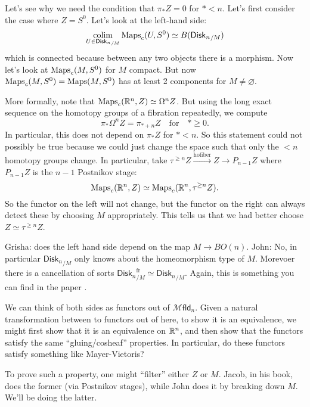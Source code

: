 \documentclass{amsart}
\DeclareMathOperator{\hofiber}{hofiber}
\newcommand{\disk}{\mathsf{Disk}_n}
\begin{document}
\begin{remark}
    Let's see why we need the condition that $\pi_*Z=0$ for $*<n$. Let's first consider the case
    where $Z=S^0$. Let's look at the left-hand side:
    \begin{align*}
        \colim_{U\in{\disk}_{/M}} \Maps_c(U,S^0) \simeq B({\disk}_{/M})
    \end{align*}
    which is connected because between any two objects there is a morphism.
    Now let's look at $\operatorname{Maps}_c(M, S^0)$ for $M$ compact. But now $\operatorname{Maps}_c(M,S^0)=\operatorname{Maps}(M,S^0)$
    has at least 2 components for $M\neq \varnothing$.

    More formally, note that $\operatorname{Maps}_c(\mathbb{R}^n,Z)\simeq \Omega^nZ$. But using the long exact
    sequence on the homotopy groups of a fibration repeatedly, we compute
    \begin{equation*}
        \pi_*\Omega^nZ = \pi_{*+n}Z \quad\text{for}\quad*\geqslant 0.
    \end{equation*}
    In particular, this does not depend on $\pi_*Z$ for $*<n$. So this statement
    could not possibly be true because we could just change the space such
    that only the $<n$ homotopy groups change. In particular, take
    $\tau^{\geq n}Z \xrightarrow{\hofiber} Z \to P_{n-1}Z$ where $P_{n-1}Z$
    is the $n-1$ Postnikov stage:
    \begin{equation*}
        \operatorname{Maps}_c(\mathbb{R}^n,Z) \simeq \operatorname{Maps}_c(\mathbb{R}^n,\tau^{\geq n}Z).
    \end{equation*}
    So the functor on the left will not change, but the functor on the right
    can always detect these by choosing $M$ appropriately. This tells us that
    we had better choose $Z\simeq \tau^{\geq n}Z$.
\end{remark}

Grisha: does the left hand side depend on the map $M\to BO(n)$. John: No,
in particular ${\disk}_{/M}$ only knows about the homeomorphism type of $M$.
Morevoer there is a cancellation of sorts ${\disk}_{/M}^\text{fr}\simeq {\disk}_{/M}$.
Again, this is something you can find in the paper \cite{AF}.

We can think of both sides as functors out of $\mathcal{M}\mathsf{fld}_n$. Given a natural
transformation between to functors out of here, to show it is an equivalence, we might
first show that it is an equivalence on $\mathbb{R}^n$, and then show that the functors satisfy
the same ``gluing/cosheaf'' properties. In particular, do these functors satisfy something
like Mayer-Vietoris?

To prove such a property, one might ``filter'' either $Z$ or $M$. Jacob, in his book, does the
former (via Postnikov stages), while John does it by breaking down $M$. We'll be doing the latter.
\end{document}
